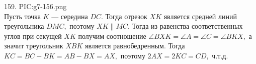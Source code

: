 159. {{PIC:g7-156.png}}\\
Пусть точка $K$ --- середина $DC.$ Тогда отрезок $XK$ является средней линий треугольника $DMC,$ поэтому $XK\parallel MC.$ Тогда из равенства соответственных углов при секущей $XK$ получим соотношение $\angle BXK=\angle A=\angle C=\angle BKX,$ а значит треугольник $XBK$ является равнобедренным. Тогда $KC=BC-BK=AB-BX=AX,$ поэтому $2AX=2KC=CD,$ ч.т.д.


